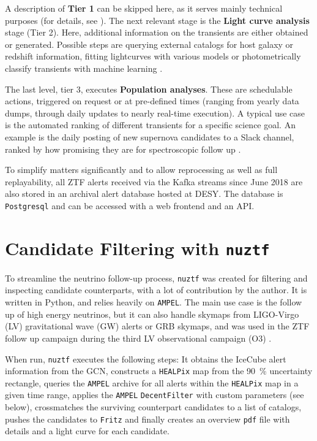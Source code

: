 A description of \textbf{Tier 1} can be skipped here, as it serves mainly technical purposes (for details, see \cite{Nordin2019}). The next relevant stage is the \textbf{Light curve analysis} stage (Tier 2). Here, additional information on the transients are either obtained or generated. Possible steps are querying external catalogs for host galaxy or redshift information, fitting lightcurves with various models or photometrically classify transients with machine learning \cite{Nordin2019}.

The last level, tier 3, executes \textbf{Population analyses}. These are schedulable actions, triggered on request or at pre-defined times (ranging from yearly data dumps, through daily updates to nearly real-time execution). A typical use case is the automated ranking of different transients for a specific science goal. An example is the daily posting of new supernova candidates to a Slack channel, ranked by how promising they are for spectroscopic follow up \cite{Nordin2019}.

To simplify matters significantly and to allow reprocessing as well as full replayability, all ZTF alerts received via the Kafka streams since June 2018 are also stored in an archival alert database hosted at DESY. The database is \texttt{Postgresql} and can be accessed with a web frontend and an API.

\section{Candidate Filtering with \texttt{nuztf}}
To streamline the neutrino follow-up process, \texttt{nuztf}  was created for filtering and inspecting candidate counterparts, with a lot of contribution by the author. It is written in Python, and relies heavily on \texttt{AMPEL}. The main use case is the follow up of high energy neutrinos, but it can also handle skymaps from LIGO-Virgo (LV) gravitational wave (GW) alerts or GRB skymaps, and was used in the ZTF follow up campaign during the third LV observational campaign (O3) \cite{Kasliwal2020}.

When run, \texttt{nuztf} executes the following steps: It obtains the IceCube alert information from the GCN, constructs a \texttt{HEALPix} map from the \SI{90}{\percent} uncertainty rectangle, queries the \texttt{AMPEL} archive for all alerts within the \texttt{HEALPix} map in a given time range, applies the \texttt{AMPEL} \texttt{DecentFilter} \cite{Nordin2019} with custom parameters (see below), crossmatches the surviving counterpart candidates to a list of catalogs, pushes the candidates to \texttt{Fritz} and finally creates an overview \texttt{pdf} file with details and a light curve for each candidate.

